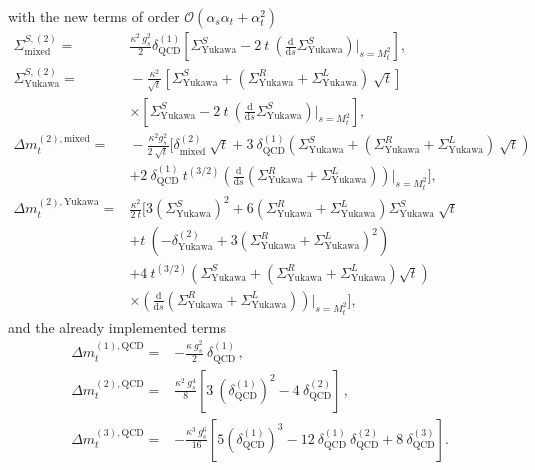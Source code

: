 \documentclass[a4paper,12pt]{book}
\begin{document}
with the new terms of order $\mathcal{O}(\alpha_s\alpha_t+\alpha_t^2)$ 
\begin{align}
\label{eq::sigma2Smixed}
\Sigma_\text{mixed}^{S,(2)} =&{} \frac{\kappa^2 \> g_s^2}{2} \delta^{(1)}_\text{QCD} \left[\Sigma_\text{Yukawa}^S- 2\>t\>\left(\frac{\text{d}}{\text{d}s}\Sigma_\text{Yukawa}^S\right)\bigg|_{s=M_t^2}\right],\\
\nonumber
\Sigma_\text{Yukawa}^{S,(2)} =&{}-\frac{\kappa^2}{\sqrt{t}} \left[\Sigma_\text{Yukawa}^S+\left(\Sigma_\text{Yukawa}^R+\Sigma_\text{Yukawa}^L\right)\>\sqrt{t}\right]\\
&\times  \left[\Sigma_\text{Yukawa}^S- 2\>t\>\left(\frac{\text{d}}{\text{d}s}\Sigma_\text{Yukawa}^S\right)\bigg|_{s=M_t^2}\right],\\
\nonumber
\Delta m_t^{(2),\text{mixed}}=&{} -\frac{\kappa^2 g_s^2}{2 \> \sqrt{t}}\bigg[\delta^{(2)}_\text{mixed} \> \sqrt{t}+3 \> \delta^{(1)}_\text{QCD}\left(\Sigma_\text{Yukawa}^S +\left(\Sigma_\text{Yukawa}^R+\Sigma_\text{Yukawa}^L\right)\>\sqrt{t}\right)\\
&+ 2\> \delta^{(1)}_\text{QCD}\> t^{(3/2)} \left(\frac{\text{d}}{\text{d}s}\left(\Sigma_\text{Yukawa}^R+\Sigma_\text{Yukawa}^L\right)\right)\bigg|_{s=M_t^2}\bigg],\\
\nonumber
\Delta m_t^{(2),\text{Yukawa}}=&{} \frac{\kappa^2}{2 \> t}\bigg[3 \left(\Sigma_\text{Yukawa}^S\right)^2+ 6 \left(\Sigma_\text{Yukawa}^R+\Sigma_\text{Yukawa}^L\right)\Sigma_\text{Yukawa}^S\> \sqrt{t}\\
\nonumber
&+t\>\left(-\delta^{(2)}_\text{Yukawa}+3\left(\Sigma_\text{Yukawa}^R+\Sigma_\text{Yukawa}^L\right)^2\right)\\
\nonumber
&+4\> t^{(3/2)}\left(\Sigma_\text{Yukawa}^S+\left(\Sigma_\text{Yukawa}^R+\Sigma_\text{Yukawa}^L\right)\sqrt{t}\right)\\
\label{eq::dmt2yukawa}
&\times \left(\frac{\text{d}}{\text{d}s}\left(\Sigma_\text{Yukawa}^R+\Sigma_\text{Yukawa}^L\right)\right)\bigg|_{s=M_t^2}\bigg],
\end{align}
and the already implemented terms
\begin{align}
\Delta m_t^{(1),\text{QCD}}={}&-\frac{\kappa\>g_s^2}{2} \>\delta^{(1)}_\text{QCD}\,,\\
\Delta m_t^{(2),\text{QCD}}={}&\frac{\kappa^2\> g_s^4}{8}\left[3\>\left(\delta^{(1)}_\text{QCD}\right)^2-4\> \delta^{(2)}_\text{QCD}\right]\,,\\
\label{eq::dmt3QCD}
\Delta m_t^{(3),\text{QCD}}={}& -\frac{\kappa^3 \> g_s^6}{16}\left[5\left(\delta^{(1)}_\text{QCD}\right)^3-12\> \delta^{(1)}_\text{QCD} \> \delta^{(2)}_\text{QCD}+8\>\delta^{(3)}_\text{QCD}\right].
\end{align} 
\end{document}
